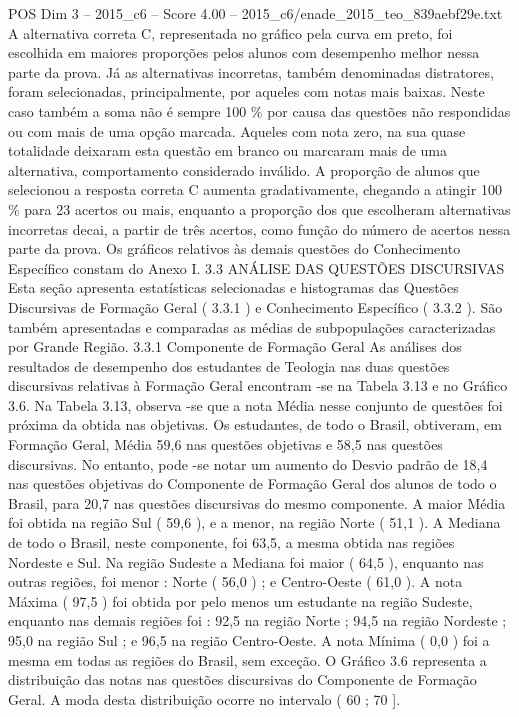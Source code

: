 \begin{textsample}{POS Dim 3 – 2015\_c6 – Score 4.00 – 2015\_c6/enade\_2015\_teo\_839aebf29e.txt}
A alternativa correta C, representada no gráfico pela curva em preto, foi escolhida em maiores proporções pelos alunos com desempenho melhor nessa parte da prova.
Já as alternativas incorretas, também denominadas distratores, foram selecionadas, principalmente, por aqueles com notas mais baixas.
Neste caso também a soma não é sempre 100 \% por causa das questões não respondidas ou com mais de uma opção marcada.
Aqueles com nota zero, na sua quase totalidade deixaram esta questão em branco ou marcaram mais de uma alternativa, comportamento considerado inválido.
A proporção de alunos que selecionou a resposta correta C aumenta gradativamente, chegando a atingir 100 \% para 23 acertos ou mais, enquanto a proporção dos que escolheram alternativas incorretas decai, a partir de três acertos, como função do número de acertos nessa parte da prova.
Os gráficos relativos às demais questões do Conhecimento Específico constam do Anexo I. 3.3 ANÁLISE DAS QUESTÕES DISCURSIVAS Esta seção apresenta estatísticas selecionadas e histogramas das Questões Discursivas de Formação Geral ( 3.3.1 ) e Conhecimento Específico ( 3.3.2 ).
São também apresentadas e comparadas as médias de subpopulações caracterizadas por Grande Região. 3.3.1 Componente de Formação Geral As análises dos resultados de desempenho dos estudantes de Teologia nas duas questões discursivas relativas à Formação Geral encontram -se na Tabela 3.13 e no Gráfico 3.6.
Na Tabela 3.13, observa -se que a nota Média nesse conjunto de questões foi próxima da obtida nas objetivas.
Os estudantes, de todo o Brasil, obtiveram, em Formação Geral, Média 59,6 nas questões objetivas e 58,5 nas questões discursivas.
No entanto, pode -se notar um aumento do Desvio padrão de 18,4 nas questões objetivas do Componente de Formação Geral dos alunos de todo o Brasil, para 20,7 nas questões discursivas do mesmo componente.
A maior Média foi obtida na região Sul ( 59,6 ), e a menor, na região Norte ( 51,1 ).
A Mediana de todo o Brasil, neste componente, foi 63,5, a mesma obtida nas regiões Nordeste e Sul.
Na região Sudeste a Mediana foi maior ( 64,5 ), enquanto nas outras regiões, foi menor : Norte ( 56,0 ) ; e Centro-Oeste ( 61,0 ).
A nota Máxima ( 97,5 ) foi obtida por pelo menos um estudante na região Sudeste, enquanto nas demais regiões foi : 92,5 na região Norte ; 94,5 na região Nordeste ; 95,0 na região Sul ; e 96,5 na região Centro-Oeste.
A nota Mínima ( 0,0 ) foi a mesma em todas as regiões do Brasil, sem exceção.
O Gráfico 3.6 representa a distribuição das notas nas questões discursivas do Componente de Formação Geral.
A moda desta distribuição ocorre no intervalo ( 60 ; 70 ].

\end{textsample}
